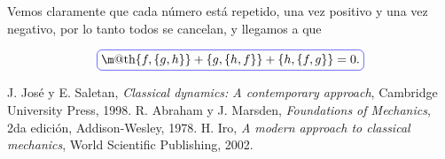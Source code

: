 \documentclass[a4paper,10pt]{article}
\makeatletter
\numberwithin{equation}{section}
\newcommand*{\boxcolor}{blue}
\renewcommand{\boxed}[1]{\textcolor{\boxcolor}{%
\tikz[baseline={([yshift=-1ex]current bounding box.center)}] \node [rectangle, minimum width=1ex,rounded corners,draw] {\normalcolor\m@th$\displaystyle#1$};}}
\makeatother
\begin{document}
Vemos claramente que cada número está repetido, una vez positivo y una vez negativo, 
por lo tanto todos se cancelan, y llegamos a que 

\begin{equation}
 \boxed{\{f,\{g,h\}\} + \{g,\{h,f\}\} + \{h,\{f,g\}\} = 0.}
\end{equation}



\begin{thebibliography}{20}
 J. José y E. Saletan, \emph{Classical dynamics: A contemporary approach}, Cambridge University Press,
 1998.
 R. Abraham y J. Marsden, \emph{Foundations of Mechanics}, 2da edición, Addison-Wesley,
 1978.
 H. Iro, \emph{A modern approach to classical mechanics}, World Scientific Publishing,
 2002.
\end{thebibliography}
\end{document}
